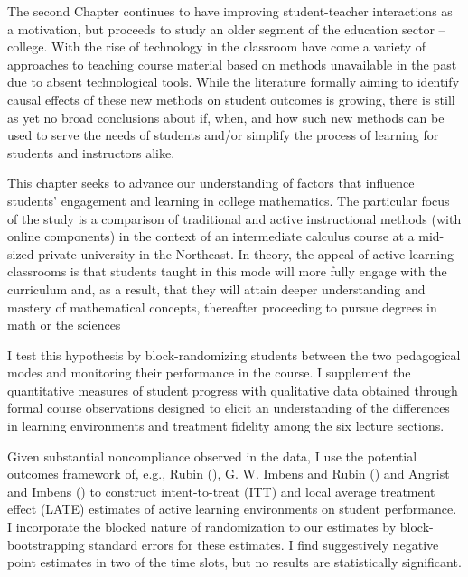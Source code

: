 The second Chapter continues to have improving student-teacher interactions as a motivation, but proceeds to study an older segment of the education sector -- college. With the rise of technology in the classroom have come a variety of
approaches to teaching course material based on methods unavailable in
the past due to absent technological tools. While the literature
formally aiming to identify causal effects of these new methods on
student outcomes is growing, there is still as yet no broad conclusions
about if, when, and how such new methods can be used to serve the needs
of students and/or simplify the process of learning for students and
instructors alike.

This chapter seeks to advance our understanding of factors that influence
students' engagement and learning in college mathematics. The particular
focus of the study is a comparison of traditional and active
instructional methods (with online components) in the context of an
intermediate calculus course at a mid-sized private university in the
Northeast. In theory, the appeal of active learning classrooms is
that students taught in this mode will more fully engage with the
curriculum and, as a result, that they will attain deeper understanding
and mastery of mathematical concepts, thereafter proceeding to pursue
degrees in math or the sciences

I test this hypothesis by block-randomizing students between the two
pedagogical modes and monitoring their performance in the course. I
supplement the quantitative measures of student progress with
qualitative data obtained through formal course observations designed to
elicit an understanding of the differences in learning environments and
treatment fidelity among the six lecture sections.

Given substantial noncompliance observed in the data, I use the
potential outcomes framework of, e.g., Rubin
(\citeyearpar{rubin}), G. W. Imbens and Rubin
(\citeyearpar{imbens}) and Angrist and Imbens
(\citeyearpar{angrist}) to construct intent-to-treat
(ITT) and local average treatment effect (LATE) estimates of active
learning environments on student performance. I incorporate the blocked
nature of randomization to our estimates by block-bootstrapping standard
errors for these estimates. I find suggestively negative point
estimates in two of the time slots, but no results are statistically
significant.

